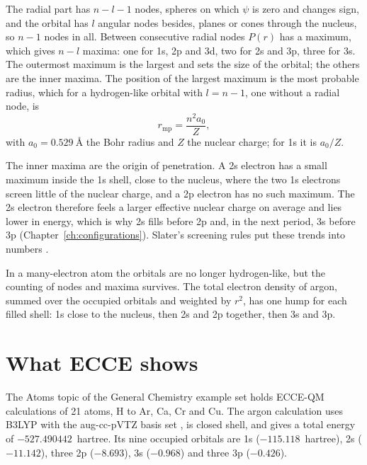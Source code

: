 The radial part has $n-l-1$ nodes, spheres on which $\psi$ is zero and changes sign, and the orbital has $l$ angular nodes besides, planes or cones through the nucleus, so $n-1$ nodes in all.
Between consecutive radial nodes $P(r)$ has a maximum, which gives $n-l$ maxima: one for 1s, 2p and 3d, two for 2s and 3p, three for 3s. The outermost maximum is the largest and sets the size of the orbital; the others are the inner maxima. The position of the largest maximum is the most probable radius,
which for a hydrogen-like orbital with $l = n-1$, one without a radial node, is
\begin{equation}
	r_\mathrm{mp} = \frac{n^2 a_0}{Z},
	\label{eq:rmp}
\end{equation}
with $a_0 = \SI{0.529}{\angstrom}$ the Bohr radius and $Z$ the nuclear charge; for 1s it is $a_0/Z$.

The inner maxima are the origin of penetration.
A 2s electron has a small maximum inside the 1s shell, close to the nucleus, where the two 1s electrons screen little of the nuclear charge, and a 2p electron has no such maximum. The 2s electron therefore feels a larger effective nuclear charge on average and lies lower in energy, which is why 2s fills before 2p and, in the next period, 3s before 3p (Chapter~\ref{ch:configurations}). Slater's screening rules put these trends into numbers \cite{slater1930}.

In a many-electron atom the orbitals are no longer hydrogen-like, but the counting of nodes and maxima survives. The total electron density of argon, summed over the occupied orbitals and weighted by $r^2$, has one hump for each filled shell: 1s close to the nucleus, then 2s and 2p together, then 3s and 3p.

\section{What ECCE shows}
The Atoms topic of the General Chemistry example set holds ECCE-QM calculations of 21 atoms, H to Ar, Ca, Cr and Cu.
The argon calculation uses B3LYP \cite{becke1993} with the aug-cc-pVTZ basis set \cite{woon1993}, is closed shell, and gives a total energy of $-527.490442$~hartree. Its nine occupied orbitals are 1s ($-115.118$~hartree), 2s ($-11.142$), three 2p ($-8.693$), 3s ($-0.968$) and three 3p ($-0.426$).

